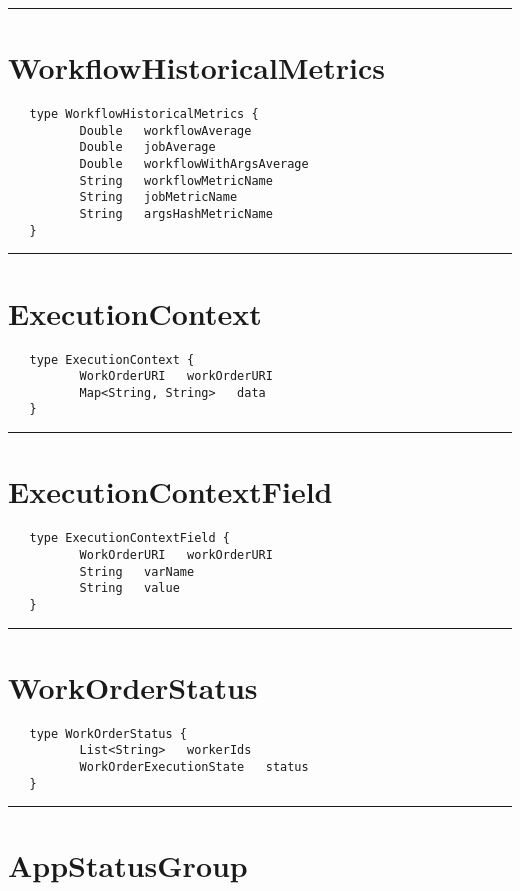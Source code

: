 \rule{15cm}{2pt}
\section{WorkflowHistoricalMetrics}
\label{type:WorkflowHistoricalMetrics}

\begin{verbatim}
   type WorkflowHistoricalMetrics {
          Double   workflowAverage
          Double   jobAverage
          Double   workflowWithArgsAverage
          String   workflowMetricName
          String   jobMetricName
          String   argsHashMetricName
   }
\end{verbatim}

\rule{15cm}{2pt}
\section{ExecutionContext}
\label{type:ExecutionContext}

\begin{verbatim}
   type ExecutionContext {
          WorkOrderURI   workOrderURI
          Map<String, String>   data
   }
\end{verbatim}

\rule{15cm}{2pt}
\section{ExecutionContextField}
\label{type:ExecutionContextField}

\begin{verbatim}
   type ExecutionContextField {
          WorkOrderURI   workOrderURI
          String   varName
          String   value
   }
\end{verbatim}

\rule{15cm}{2pt}
\section{WorkOrderStatus}
\label{type:WorkOrderStatus}

\begin{verbatim}
   type WorkOrderStatus {
          List<String>   workerIds
          WorkOrderExecutionState   status
   }
\end{verbatim}

\rule{15cm}{2pt}
\section{AppStatusGroup}
\label{type:AppStatusGroup}

